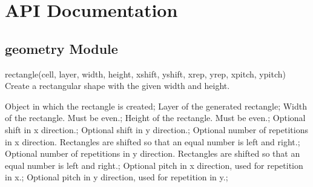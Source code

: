 \cleardoublepage

\section{API Documentation}

\subsection{geometry Module}

\begin{APIfunc}{rectangle(cell, layer, width, height, xshift, yshift, xrep, yrep, xpitch, ypitch)}
    Create a rectangular shape with the given width and height.
    \begin{APIparameters}
            Object in which the rectangle is created;
            Layer of the generated rectangle;
            Width of the rectangle. Must be even.;
            Height of the rectangle. Must be even.;
            Optional shift in x direction.;
            Optional shift in y direction.;
            Optional number of repetitions in x direction.
            Rectangles are shifted so that an equal number is left and right.;
            Optional number of repetitions in y direction.
            Rectangles are shifted so that an equal number is left and right.;
            Optional pitch in x direction, used for repetition in x.;
            Optional pitch in y direction, used for repetition in y.;
    \end{APIparameters}
\end{APIfunc}

